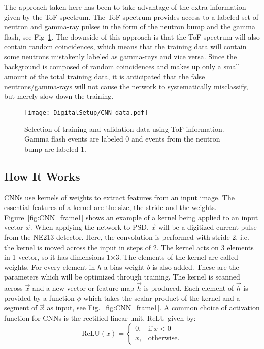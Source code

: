 \documentclass[main.tex]{subfiles}
\begin{document}
The approach taken here has been to take advantage of the extra information given by the ToF spectrum. The ToF spectrum provides access to a labeled set of neutron and gamma-ray pulses in the form of the neutron bump and the gamma flash, see Fig~\ref{fig:CNN_data}. The downside of this approach is that the ToF spectrum will also contain random coincidences, which means that the training data will contain some neutrons mistakenly labeled as gamma-rays and vice versa. Since the background is composed of random coincidences and makes up only a small amount of the total training data, it is anticipated that the false neutrons/gamma-rays will not cause the network to systematically misclassify, but merely slow down the training.

\begin{figure}[h!]
    \centering
        \texttt{[image: DigitalSetup/CNN\_data.pdf]}
        \caption[Selection of training and validation data]{Selection of training and validation data using ToF information. Gamma flash events are labeled 0 and events from the neutron bump are labeled 1.}
    \label{fig:CNN_data} 
\end{figure}

\subsection{How It Works}
CNNs use kernels of weights to extract features from an input image. The essential features of a kernel are the size, the stride and the weights. Figure~\ref{fig:CNN_frame1} shows an example of a kernel being applied to an input vector $\vec{x}$. When applying the network to PSD, $\vec{x}$ will be a digitized current pulse from the NE213 detector. Here, the convolution is performed with stride 2, i.e. the kernel is moved across the input in steps of 2. The kernel acts on 3 elements in 1 vector, so it has dimensions 1$\times$3. The elements of the kernel are called weights. For every element in $h$ a bias weight $b$ is also added. These are the parameters which will be optimized through training. The kernel is scanned across $\vec{x}$ and a new vector or feature map $\vec{h}$ is produced. Each element of $\vec{h}$ is provided by a function $\phi$ which takes the scalar product of the kernel and a segment of $\vec{x}$ as input, see Fig.~\ref{fig:CNN_frame1}. 
A common choice of activation function for CNNs is the rectified linear unit, ReLU given by:
\begin{equation}
	\textrm{ReLU}(x) = 
	\begin{cases}
    	0, & \text{if}\ x<0 \\
    	x, & \text{otherwise}.
    \end{cases}
\end{equation}
\end{document}
